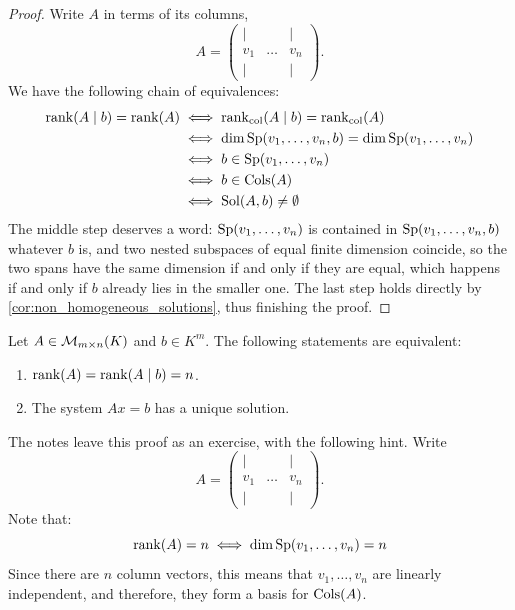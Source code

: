 \begin{proof}
Write $A$ in terms of its columns,
\[
    A = \begin{pmatrix} | & & | \\ v_1 & \dots & v_n \\ | & & | \end{pmatrix}.
\]
We have the following chain of equivalences:
\begin{align*}
    \operatorname{rank}(A \mid b) = \operatorname{rank}(A) &\iff \operatorname{rank}_{\text{col}}(A \mid b) = \operatorname{rank}_{\text{col}}(A) \\
    &\iff \dim \operatorname{Sp}(v_1, \dots, v_n, b) = \dim \operatorname{Sp}(v_1, \dots, v_n) \\
    &\iff b \in \operatorname{Sp}(v_1, \dots, v_n) \\
    &\iff b \in \operatorname{Cols}(A) \\
    &\iff \operatorname{Sol}(A, b) \neq \emptyset
\end{align*}
The middle step deserves a word: $\operatorname{Sp}(v_1, \dots, v_n)$ is contained in $\operatorname{Sp}(v_1, \dots, v_n, b)$ whatever $b$ is, and two nested subspaces of equal finite dimension coincide, so the two spans have the same dimension if and only if they are equal, which happens if and only if $b$ already lies in the smaller one. The last step holds directly by \cref{cor:non_homogeneous_solutions}, thus finishing the proof.
\end{proof}

\begin{proposition}
\label{prop:unique_solution_rank_criterion}
Let $A \in \mathcal{M}_{m \times n}(K)$ and $b \in K^m$. The following statements are equivalent:
\begin{enumerate}
    \item $\operatorname{rank}(A) = \operatorname{rank}(A \mid b) = n$.
    \item The system $Ax = b$ has a unique solution.
\end{enumerate}
\end{proposition}

\begin{exercise}
\label{exc:unique_solution_rank_criterion}
The notes leave this proof as an exercise, with the following hint.
Write
\[
    A = \begin{pmatrix} | & & | \\ v_1 & \dots & v_n \\ | & & | \end{pmatrix}.
\]
Note that:
\begin{equation*}
    \operatorname{rank}(A) = n \iff \dim \operatorname{Sp}(v_1, \dots, v_n) = n
\end{equation*}
Since there are $n$ column vectors, this means that $v_1, \dots, v_n$ are linearly independent, and therefore, they form a basis for $\operatorname{Cols}(A)$.
\end{exercise}

